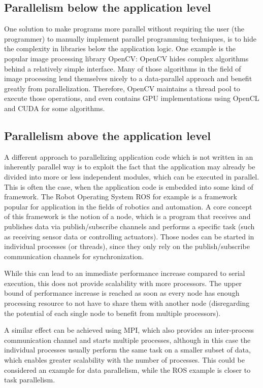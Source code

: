 \documentclass[BCOR20mm,DIV14,10pt,headinclude,footexclude,bibtotoc,liststotoc]{article}
\begin{document}
\subsection{Parallelism below the application level}
One solution to make programs more parallel without requiring the user (the
programmer) to manually implement parallel programming techniques, is to hide
the complexity in libraries below the application logic. One example is the
popular image processing library OpenCV: OpenCV hides complex algorithms behind
a relatively simple interface. Many of those algorithms in the field of image
processing lend themselves nicely to a data-parallel approach and benefit
greatly from parallelization. Therefore, OpenCV maintains a thread pool to
execute those operations, and even contains GPU implementations using OpenCL and
CUDA for some algorithms.

\subsection{Parallelism above the application level}
A different approach to parallelizing application code which is not written in
an inherently parallel way is to exploit the fact that the application may
already be divided into more or less independent modules, which can be executed
in parallel. This is often the case, when the application code is embedded into
some kind of framework. The Robot Operating System ROS for example is a
framework popular for application in the fields of robotics and automation. A
core concept of this framework is the notion of a node, which is a program that
receives and publishes data via publish/subscribe channels and performs a
specific task (such as receiving sensor data or controlling actuators). Those
nodes can be started in individual processes (or threads), since they only rely
on the publish/subscribe communication channels for synchronization.

While this can lead to an immediate performance increase compared to serial
execution, this does not provide scalability with more processors. The upper
bound of performance increase is reached as soon as every node has enough
processing resource to not have to share them with another node (disregarding
the potential of each single node to benefit from multiple processors).

A similar effect can be achieved using MPI, which also provides an inter-process
communication channel and starts multiple processes, although in this case the
individual processes usually perform the same task on a smaller subset of data,
which enables greater scalability with the number of processes. This could be
considered an example for data parallelism, while the ROS example is closer to
task parallelism.
\end{document}
